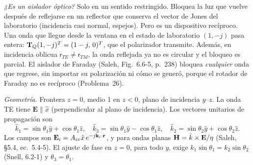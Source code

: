 \emph{¿Es un aislador óptico?} Solo en un sentido restringido. Bloquea la luz que vuelve después de
reflejarse en un reflector que conserva el vector de Jones del laboratorio (incidencia casi normal, espejos).
Pero es un dispositivo recíproco. Una onda que llegue desde la ventana en el estado de laboratorio
$(1,-j)$ pasa entera: $\mathbf T_Q(1,-j)^T=(1-j,\,0)^T$, que el polarizador transmite. Además, en incidencia oblicua
$\mathsf r_{TE}\neq\mathsf r_{TM}$, la onda reflejada ya no es circular y el bloqueo es parcial. El aislador de
Faraday (Saleh, Fig.~6.6-5, p.~238) bloquea \emph{cualquier} onda que regrese, sin importar su
polarización ni cómo se generó, porque el rotador de Faraday no es recíproco (Problema~26).


\label{sol:21}

 \emph{Geometría.} Frontera $z=0$, medio 1 en $z<0$, plano de incidencia $y$--$z$. La onda
TE tiene $\mathbf E\parallel\hat x$ (perpendicular al plano de incidencia). Los vectores unitarios de
propagación son
\[
\hat k_1=\sin\theta_1\hat y+\cos\theta_1\hat z,\quad
\hat k_3=\sin\theta_1\hat y-\cos\theta_1\hat z,\quad
\hat k_2=\sin\theta_2\hat y+\cos\theta_2\hat z .
\]
Los campos son $\mathbf E_i=A_{ix}\hat x\,e^{-j\mathbf k_i\cdot\mathbf r}$, y para ondas planas
$\mathbf H=\hat k\times\mathbf E/\eta$ (Saleh, §5.4, ec.~5.4-5). El ajuste de fase en $z=0$, para todo $y$, exige
$k_1\sin\theta_1=k_2\sin\theta_2$ (Snell, 6.2-1) y $\theta_3=\theta_1$.

